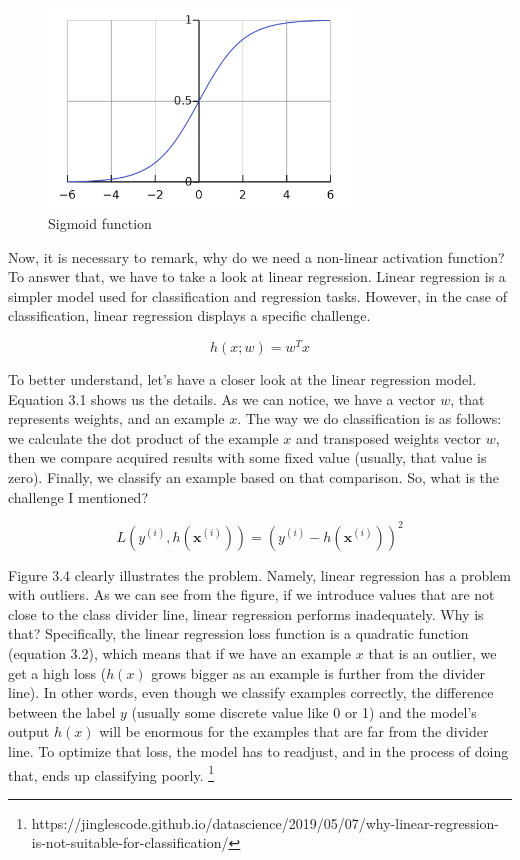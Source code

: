 \documentclass[times, utf8, seminar]{fer}
\begin{document}
\begin{figure}[h]
	\centering
	\includegraphics[width=8cm]{sigmoid}
	\caption{Sigmoid function \protect \footnotemark}
\end{figure}


Now, it is necessary to remark, why do we need a non-linear activation function? To answer that, we have to take a look at linear regression. Linear regression is a simpler model used for classification and regression tasks. However, in the case of classification, linear regression displays a specific challenge. 

\begin{equation}
	h(x; w) = w^{T}x 
\end{equation}

To better understand, let's have a closer look at the linear regression model. Equation 3.1 shows us the details. As we can notice, we have a vector $w$, that represents weights, and an example $x$. The way we do classification is as follows: we calculate the dot product of the example $x$ and transposed weights vector $w$, then we compare acquired results with some fixed value (usually, that value is zero). Finally, we classify an example based on that comparison. So, what is the challenge I mentioned?

\newpage

\begin{equation}
L(y^{(i)}, h(\textbf{x}^{(i)})) = (y^{(i)} - h(\textbf{x}^{(i)}))^2
\end{equation}

Figure 3.4 clearly illustrates the problem. Namely, linear regression has a problem with outliers. As we can see from the figure, if we introduce values that are not close to the class divider line, linear regression performs inadequately. Why is that? Specifically, the linear regression loss function is a quadratic function (equation 3.2), which means that if we have an example $x$ that is an outlier, we get a high loss ($h(x)$ grows bigger as an example is further from the divider line). In other words, even though we classify examples correctly, the difference between the label $y$ (usually some discrete value like 0 or 1) and the model's output $h(x)$ will be enormous for the examples that are far from the divider line. To optimize that loss, the model has to readjust, and in the process of doing that, ends up classifying poorly.    \footnote{https://jinglescode.github.io/datascience/2019/05/07/why-linear-regression-is-not-suitable-for-classification/}
\end{document}
